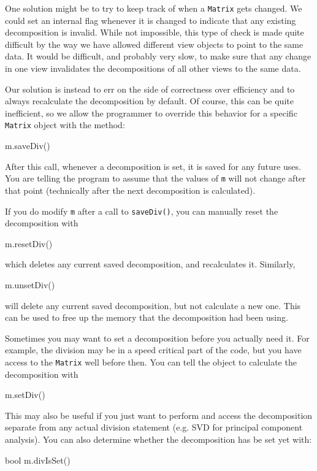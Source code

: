 \documentclass[twoside,letterpaper,11pt]{article}
\renewcommand{\tt}[1]{{\lstinline {#1}}}
\begin{document}
One solution might be to try to keep track of when a \tt{Matrix} gets changed.  
We could set an
internal flag whenever it is changed to indicate that
any existing decomposition is invalid.  While not impossible,
this type of check is made
quite difficult by the way we have allowed different view objects to point to the same data.  
It would
be difficult, and probably very slow, to make sure that any change in one view invalidates the decompositions
of all other views to the same data.

Our solution is instead to err on the side of correctness over efficiency and
to always recalculate the decomposition by default.  Of course, this
can be quite inefficient, so we allow the programmer to override this
behavior for a specific \tt{Matrix} object with the method:
\begin{tmvcode}
m.saveDiv()
\end{tmvcode}
After this call, whenever a decomposition is set, it is saved for any future uses.
You are telling the program to assume that the values of \tt{m} will not change after 
that point (technically after
the next decomposition is calculated).

If you do modify \tt{m} after a call to \tt{saveDiv()}, 
you can manually reset the decomposition with
\begin{tmvcode}
m.resetDiv()
\end{tmvcode}
which deletes any current saved decomposition, and recalculates it.
Similarly,
\begin{tmvcode}
m.unsetDiv()
\end{tmvcode}
will delete any current saved decomposition, but not calculate a new one.
This can be used to free up the memory that the decomposition had been using.

Sometimes you may want to set a decomposition before you actually need it.
For example, the division may be in a speed critical part of the code, but you have
access to the \tt{Matrix} well before then.  
You can tell the object to calculate the decomposition with
\begin{tmvcode}
m.setDiv()
\end{tmvcode}
This may also be useful if you just want to perform and access the decomposition
separate from any actual division statement (e.g. SVD for principal component analysis).
You can also determine whether the decomposition has be set yet with:
\begin{tmvcode}
bool m.divIsSet()
\end{tmvcode}
\end{document}
